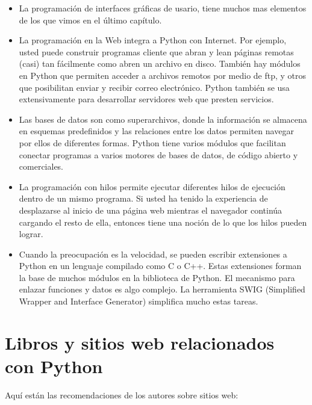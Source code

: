 \begin{itemize}

\item La programación de interfaces gráficas de usario, tiene muchos mas
elementos de los que vimos en el último capítulo.

\item La programación en la Web integra a Python con Internet. Por ejemplo,
usted puede construir programas cliente que abran y lean  páginas
remotas (casi) tan fácilmente como abren un archivo en disco. También 
hay módulos en Python que permiten acceder a archivos remotos por medio
de ftp, y otros que posibilitan enviar y recibir correo electrónico. Python
también se usa extensivamente para desarrollar servidores web que
presten servicios.


\item Las bases de datos son como superarchivos, donde la información
se almacena en esquemas predefinidos y las relaciones entre los 
datos permiten navegar por ellos de diferentes formas. Python tiene
varios módulos que facilitan conectar programas a varios motores de
bases de datos, de código abierto y comerciales.

\item La programación con hilos permite ejecutar diferentes hilos
de ejecución dentro de un mismo programa. Si usted ha tenido la 
experiencia de desplazarse al inicio de una página web mientras 
el navegador continúa cargando el resto de ella, entonces tiene
una noción de lo que los hilos pueden lograr.

\item Cuando la preocupación es la velocidad, se pueden escribir
extensiones a Python en un lenguaje compilado como C o C++. Estas
extensiones forman la base de muchos módulos en la biblioteca de
Python. El mecanismo para enlazar funciones y datos es algo 
complejo. La herramienta SWIG (Simplified Wrapper and Interface Generator)
simplifica mucho estas tareas.
\end{itemize}


\section{Libros y sitios web relacionados con Python}

Aquí están las recomendaciones de los autores sobre sitios web:

